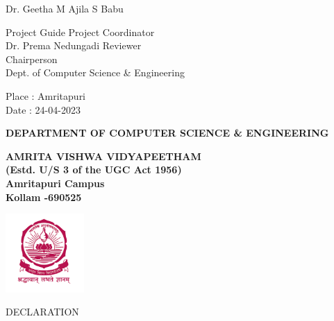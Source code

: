 \documentclass[oneside,12pt]{Classes/CUEDthesisPSnPDF}
\begin{document}



\vspace{20pt}

\begin{flushleft}
	\vspace{5pt}
	Dr. Geetha M \hspace{242pt} Ajila S Babu\\

	\vspace{3pt}

	Project Guide \hspace{230pt} Project Coordinator\\[10ex]



	Dr. Prema Nedungadi  \hspace{240pt} Reviewer\\  Chairperson\\ Dept. of Computer Science \& Engineering \\[8ex]




\end{flushleft}

\begin{flushleft}

	\vspace{5pt}

	Place	:	Amritapuri \\
	Date	: 24-04-2023

\end{flushleft}



\pagebreak


\begin{center}

	{\normalsize {\bfseries{DEPARTMENT OF COMPUTER SCIENCE \& ENGINEERING\\[1ex]}}}


	{\normalsize {\bfseries{AMRITA VISHWA VIDYAPEETHAM\\ (Estd. U/S 3 of the UGC Act 1956)\\ [1ex]Amritapuri  Campus \\[1ex] Kollam -690525\\[1ex]}}}

	\includegraphics[width=30mm]{UNIVEMBLEM.png}


	\rmfamily\bfseries\upshape\Large

	DECLARATION \\[2ex]


\end{center}
\end{document}
